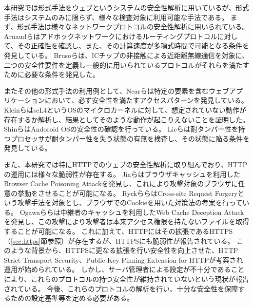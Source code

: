 \documentclass[journal]{IEEEtran}
\begin{document}

本研究では形式手法をウェブというシステムの安全性解析に用いているが、形式手法はシステムのみに限らず、様々な検査対象に利用可能な手法である。
まず、形式手法は様々なネットワークプロトコルの安全性解析に用いられている。
Arnaudら\cite{modeling-and-verifying-ad-hoc}はアドホックネットワークにおけるルーティングプロトコルに対して、その正確性を確認し、また、その計算速度が多項式時間で可能となる条件を発見している。
Brusoら\cite{formal-verification-of-privacy-for}は、ICチップの非接触による近距離無線通信\cite{formal-verification-of-privacy-for}を対象に、二つの安全性要件を定義し一般的に用いられているプロトコルがそれらを満たすために必要な条件を発見した。

またその他の形式手法の利用例として、Nearら\cite{finding_security_bugs_in_web}は特定の要素を含むウェブアプリケーションにおいて、必ず安全性を満たすアクセスパターンを発見している。
Kleinら\cite{sel4_formal_verification_of_an}はseL4というOSのマイクロカーネルに対して、想定されていない動作が存在するか解析し、結果としてそのような動作が起こりえないことを証明した。
Shinら\cite{towards_formal_analysis_of_the}はAndoroid OSの安全性の確認を行っている。
Lieら\cite{specifying_and_verifying_hardware_for_tamper}は耐タンパー性を持つプロセッサが耐タンパー性を失う状態の有無を検査し、その状態に陥る条件を発見している。

また、本研究では特にHTTPでのウェブの安全性解析に取り組んでおり、HTTPの運用には様々な脆弱性が存在する。
Jiaら\cite{bcpattack}はブラウザキャッシュを利用したBrowser Cache Poisoning Attackを発見し、これにより攻撃対象のブラウザに任意の挙動をさせることが可能になる。
Ryckら\cite{cookie-model}らはCross-site Request Forgeryという攻撃手法を対象とし、ブラウザでのCookieを用いた対策法の考案を行っている。
Ogawaら\cite{WCD}らは中継者のキャッシュを利用したWeb Cache Deception Attackを発見し、この攻撃により攻撃者は本来アクセス権限を持たないファイルを取得することが可能になる。
これに加えて、HTTPにはその拡張であるHTTPS（\ref{sec:https}節参照）が存在するが、HTTPSにも脆弱性が報告されている\cite{poodle}。
このような背景から、HTTPSに更なる拡張を行い安全性を向上させた、HTTP Strict Transport Security\cite{hsts}、Public Key Pinning Extension for HTTP\cite{hpkp}が考案され運用が始められている。
しかし、サーバ管理者による設定が不十分であることにより、これらのプロトコルの持つ安全性が維持されていないという現状が報告されている\cite{hstshpkp}。
今後、これらのプロトコルの解析を行い、十分な安全性を保障するための設定基準等を定める必要がある。
\end{document}
